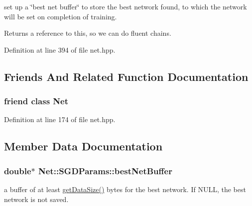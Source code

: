 set up a \char`\"{}best net buffer\char`\"{} to store the best network found, to which the network will be set on completion of training. 

\begin{DoxyReturn}{Returns}
a reference to this, so we can do fluent chains. 
\end{DoxyReturn}


Definition at line 394 of file net.\+hpp.



\subsection{Friends And Related Function Documentation}
\subsubsection[{\texorpdfstring{Net}{Net}}]{\setlength{\rightskip}{0pt plus 5cm}friend class {\bf Net}\hspace{0.3cm}{\ttfamily [friend]}}\hypertarget{structNet_1_1SGDParams_a18aff2af13a58cdbdf65a107df14ec07}{}\label{structNet_1_1SGDParams_a18aff2af13a58cdbdf65a107df14ec07}


Definition at line 174 of file net.\+hpp.



\subsection{Member Data Documentation}
\subsubsection[{\texorpdfstring{best\+Net\+Buffer}{bestNetBuffer}}]{\setlength{\rightskip}{0pt plus 5cm}double$\ast$ Net\+::\+S\+G\+D\+Params\+::best\+Net\+Buffer}\hypertarget{structNet_1_1SGDParams_a2372741f5e570248863ca0cc254fb1c1}{}\label{structNet_1_1SGDParams_a2372741f5e570248863ca0cc254fb1c1}


a buffer of at least \hyperlink{classNet_a18dfc4bbf338d5167e787edefef8cd43}{get\+Data\+Size()} bytes for the best network. If N\+U\+LL, the best network is not saved. 



